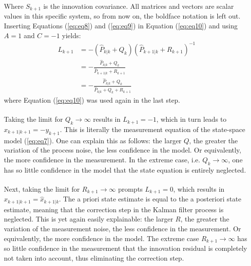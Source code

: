 \documentclass[a4paper,kul]{kulakarticle} %
\begin{document}
\noindent Where $S_{k+1}$ is the innovation covariance. All matrices and vectors are scalar values in this specific system, so from now on, the boldface notation is left out. Inserting Equations (\ref{eq:eq8}) and (\ref{eq:eq9}) in Equation (\ref{eq:eq10}) and using $A = 1$ and $C = -1$ yields:
\begin{equation}
	\begin{split}
	L_{k+1} &= -\left( \hat{P}_{k|k} + Q_k \right) \left( \hat{P}_{k+1|k} + R_{k+1} \right)^{-1} \\
	&= - \frac{\hat{P}_{k|k} + Q_k}{\hat{P}_{k+1|k} + R_{k+1}} \\
	&= - \frac{\hat{P}_{k|k} + Q_k}{\hat{P}_{k|k} + Q_k + R_{k+1}}
	\end{split}
	\label{eq:eq11}
\end{equation}
where Equation (\ref{eq:eq10}) was used again in the last step.
\\\\
Taking the limit for $Q_k \rightarrow \infty$ results in $L_{k+1} = -1$, which in turn leads to $\hat{x}_{k+1|k+1} = -y_{k+1}$. This is literally the measurement equation of the state-space model (\ref{eq:eq7}). One can explain this as follows: the larger $Q$, the greater the variation of the process noise, the less confidence in the model. Or equivalently, the more confidence in the measurement. In the extreme case, i.e. $Q_k \rightarrow \infty$, one has so little confidence in the model that the state equation is entirely neglected. 
\\\\
Next, taking the limit for $R_{k+1} \rightarrow \infty$ prompts $L_{k+1} = 0$, which results in $\hat{x}_{k+1|k+1} = \hat{x}_{k+1|k}$. The a priori state estimate is equal to the a posteriori state estimate, meaning that the correction step in the Kalman filter process is neglected. This is yet again easily explainable: the larger $R$, the greater the variation of the measurement noise, the less confidence in the measurement. Or equivalently, the more confidence in the model. The extreme case $R_{k+1} \rightarrow \infty$ has so little confidence in the measurement that the innovation residual is completely not taken into account, thus eliminating the correction step.
\end{document}
